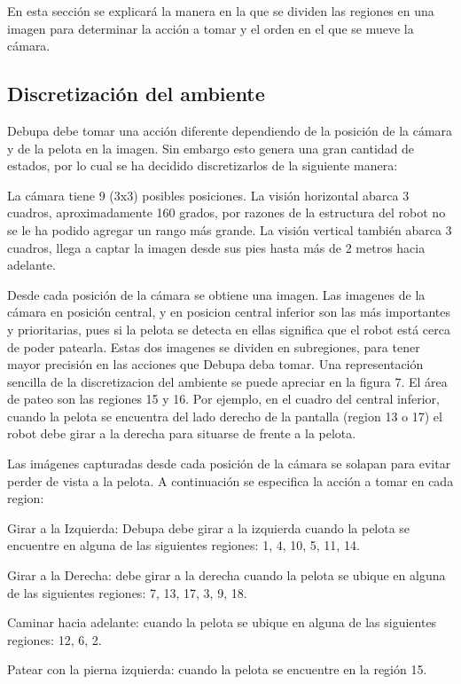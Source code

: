 En esta sección se explicará la manera en la que se dividen las regiones en una imagen para determinar la acción a tomar y el orden en el que se mueve la cámara.

\subsection{Discretización del ambiente}


Debupa debe tomar una acción diferente dependiendo de la posición de la cámara y de la pelota en la imagen. Sin embargo esto genera una gran cantidad de estados, por lo cual se ha decidido discretizarlos de la siguiente manera:  

La cámara tiene 9 (3x3) posibles posiciones. La visión horizontal abarca 3 cuadros, aproximadamente 160 grados, por razones de la estructura del robot no se le ha podido agregar un rango más grande. La visión vertical también abarca 3 cuadros, llega a captar la imagen desde sus pies hasta más de 2 metros hacia adelante.

Desde cada posición de la cámara se obtiene una imagen. Las imagenes de la cámara en posición central, y en posicion central inferior son las más importantes y prioritarias, pues si la pelota se detecta en ellas significa que el robot está cerca de poder patearla. Estas dos imagenes se dividen en subregiones, para tener mayor precisión en las acciones que Debupa deba tomar. Una representación sencilla de la discretizacion del ambiente se puede apreciar en la figura 7. El área de pateo son las regiones 15 y 16. Por ejemplo, en el cuadro del central inferior, cuando la pelota se encuentra del lado derecho de la pantalla (region 13 o 17) el robot debe girar a la derecha para situarse de frente a la pelota.

Las imágenes capturadas desde cada posición de la cámara se solapan para evitar perder de vista a la pelota. A continuación se especifica la acción a tomar en cada region: 
 
Girar a la Izquierda: Debupa debe girar a la izquierda cuando la pelota se encuentre en alguna de las siguientes regiones: 1, 4, 10, 5, 11, 14.

Girar a la Derecha: debe girar a la derecha cuando la pelota se ubique en alguna de las siguientes regiones: 7, 13, 17, 3, 9, 18. 

Caminar hacia adelante: cuando la pelota se ubique en alguna de las siguientes regiones: 12, 6, 2.

Patear con la pierna izquierda: cuando la pelota se encuentre en la región 15.

